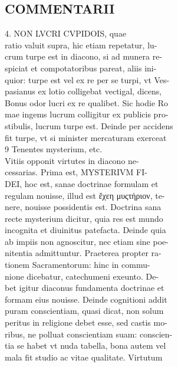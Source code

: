 \documentclass{article}
\begin{document}
\begin{pages}
\section*{COMMENTARII \\
                }4. NON LVCRI CVPIDOIS, quae \\
                ratio valuit supra, hic etiam repetatur, lu- \\
                crum turpe est in diacono, si ad munera re- \\
                spiciat et compotatoribus pareat, aliis ini- \\
                quior: turpe est vel ex re per se turpi, vt Ves- \\
                pasianus ex lotio colligebat vectigal, dicens, \\
                Bonus odor lucri ex re qualibet. Sic hodie Ro \\
                mae ingems lucrum colligitur ex publicis pro- \\
                stibulis, lucrum turpe est. Deinde per accidens \\
                fit turpe, vt si minister mercaturam exerceat \\
                9 Tenentes mysterium, etc. \\
                Vitiis opponit virtutes in diacono ne- \\
                cessarias. Prima est, MYSTERIVM FI- \\
                DEI, hoc est, sanae doctrinae formulam et \\
                regulam nouisse, illud est ἔχεη μυςτήριον, te- \\
                nere, nouisse possidentis est. Doctrina sana \\
                recte mysterium dicitur, quia res est mundo \\
                incognita et diuinitus patefacta. Deinde quia \\
                ab impiis non agnoscitur, nec etiam sine poe- \\
                nitentia admittuntur. Praeterea propter ra- \\
                tionem Sacramentorum: hinc in commu- \\
                nione dicebatur, catechumeni exeunto. De- \\
                bet igitur diaconus fundamenta doctrinae et \\
                formam eius nouisse. Deinde cognitioni addit \\
                puram conscientiam, quasi dicat, non solum \\
                peritus in religione debet esse, sed castis mo- \\
                ribus, ne polluat conscientiam suam: conscien- \\
                tia se habet vt nuda tabella, bona autem vel \\
                mala fit studio ac vitae qualitate. Virtutum \\
                

\end{pages}
\end{document}
